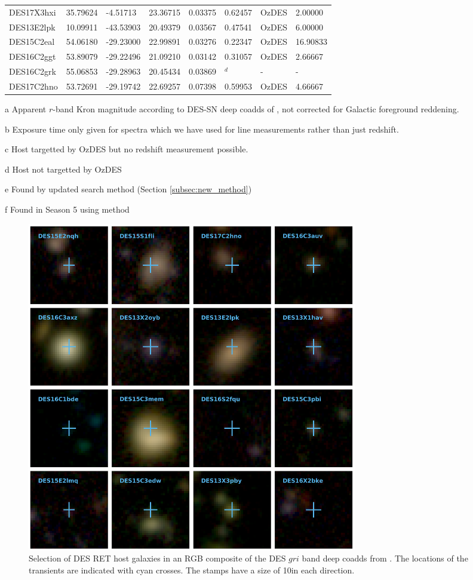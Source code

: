 \documentclass[fleqn,usenatbib,]{mnras}
\begin{document}
\begin{table}
\begin{threeparttable}
\begin{tabular}{llllllll}
DES17X3hxi     & 35.79624 &  -4.51713 & 23.36715 & 0.03375 & 0.62457 &      OzDES &       2.00000 \\
DES13E2lpk     & 10.09911 & -43.53903 & 20.49379 & 0.03567 & 0.47541 &      OzDES &       6.00000 \\
DES15C2eal     & 54.06180 & -29.23000 & 22.99891 & 0.03276 & 0.22347 &      OzDES &      16.90833 \\
DES16C2ggt     & 53.89079 & -29.22496 & 21.09210 & 0.03142 & 0.31057 &      OzDES &       2.66667 \\
DES16C2grk     & 55.06853 & -29.28963 & 20.45434 & 0.03869 &    $^d$ &          - &             - \\
DES17C2hno     & 53.72691 & -29.19742 & 22.69257 & 0.07398 & 0.59953 &      OzDES &       4.66667 \\
\bottomrule
\end{tabular}
\begin{tablenotes}
\item[a] Apparent $r$-band Kron magnitude according to DES-SN deep coadds of \citet{Wiseman2020}, not corrected for Galactic foreground reddening.
\item[b] Exposure time only given for spectra which we have used for line measurements rather than just redshift.
\item[c] Host targetted by OzDES but no redshift measurement possible.
\item[d] Host not targetted by OzDES
\item[e] Found by updated search method (Section \ref{subsec:new_method})
\item[f] Found in Season 5 using  method 
\end{tablenotes}
\end{threeparttable}
\label{tab:obs}
\end{table}

\begin{figure}
\includegraphics[width=0.7\textwidth]{figs/RET_Mosaic.png}
\caption{Selection of DES RET host galaxies in an RGB composite of the DES $gri$ band deep coadds from \citet{Wiseman2020}. The locations of the transients are indicated with cyan crosses. The stamps have a size of 10\arcsec in each direction.
\label{fig:mosaic}}
\end{figure}
\end{document}
